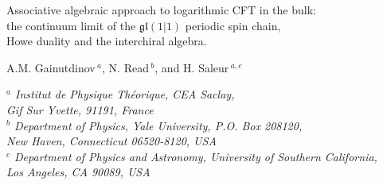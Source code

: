 \documentclass[11pt]{article}
\newcommand{\gl}{\mathfrak{gl}}
\theoremstyle{definition}
\begin{document}
\begin{center}

\Large{Associative algebraic approach to  logarithmic CFT in the bulk:\\ the continuum limit of the $\gl(1|1)$ periodic spin chain, \\Howe duality and  the interchiral algebra.}
\vskip 1cm

{\large A.M. Gainutdinov\,$^{a}$, N. Read\,$^{b}$, and
H. Saleur\,$^{a,c}$}

\vspace{1.0cm}



{\sl\small $^a$  Institut de Physique Th\'eorique, CEA Saclay,\\
Gif Sur Yvette, 91191, France\\}
{\sl\small $^b$ Department of Physics, Yale University, P.O. Box 208120,\\ New Haven, Connecticut 06520-8120, USA\\}
{\sl\small $^c$ Department of Physics and Astronomy,
University of Southern California,\\
Los Angeles, CA 90089, USA\\}

\end{center}
\end{document}
